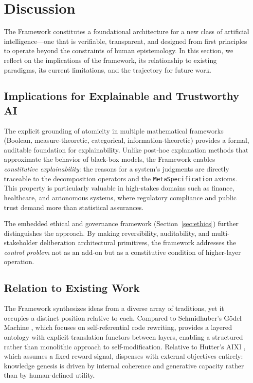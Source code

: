 \section{Discussion}
\label{sec:discussion}

The \Apeiron{} Framework constitutes a foundational architecture for a new class of artificial intelligence---one that is verifiable, transparent, and designed from first principles to operate beyond the constraints of human epistemology. In this section, we reflect on the implications of the framework, its relationship to existing paradigms, its current limitations, and the trajectory for future work.

\subsection{Implications for Explainable and Trustworthy AI}

The explicit grounding of atomicity in multiple mathematical frameworks (Boolean, measure-theoretic, categorical, information-theoretic) provides a formal, auditable foundation for explainability. Unlike post-hoc explanation methods that approximate the behavior of black-box models, the \Apeiron{} Framework enables \emph{constitutive explainability}: the reasons for a system's judgments are directly traceable to the decomposition operators and the \texttt{MetaSpecification} axioms. This property is particularly valuable in high-stakes domains such as finance, healthcare, and autonomous systems, where regulatory compliance and public trust demand more than statistical assurances.

The embedded ethical and governance framework (Section~\ref{sec:ethics}) further distinguishes the \Apeiron{} approach. By making reversibility, auditability, and multi-stakeholder deliberation architectural primitives, the framework addresses the \emph{control problem} not as an add-on but as a constitutive condition of higher-layer operation.

\subsection{Relation to Existing Work}

The \Apeiron{} Framework synthesizes ideas from a diverse array of traditions, yet it occupies a distinct position relative to each. Compared to Schmidhuber's G\"odel Machine \cite{schmidhuber2007}, which focuses on self-referential code rewriting, \Apeiron{} provides a layered ontology with explicit translation functors between layers, enabling a structured rather than monolithic approach to self-modification. Relative to Hutter's AIXI \cite{hutter2005}, which assumes a fixed reward signal, \Apeiron{} dispenses with external objectives entirely: knowledge genesis is driven by internal coherence and generative capacity rather than by human-defined utility.

